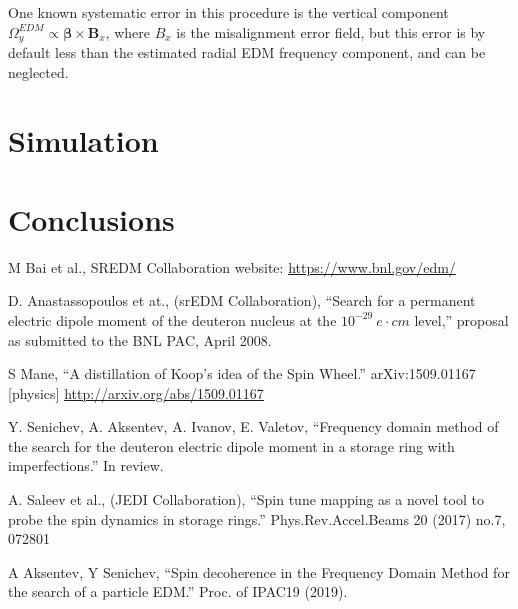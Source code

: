 \documentclass[a4paper]{jacow}
\renewcommand{\vec}{\boldsymbol}
\newcommand{\W}{\Omega}
\begin{document}
One known systematic error in this procedure is the vertical component $\W_y^{EDM} \propto \vec\beta\times\vec B_x$, where $B_x$ is the misalignment error field, but this error is by default less than the estimated radial EDM frequency component, and can be neglected.

\section{Simulation}

\section{Conclusions}


\begin{thebibliography}{9}

  M Bai et al., SREDM Collaboration website: \url{https://www.bnl.gov/edm/}

  D. Anastassopoulos et at., (srEDM Collaboration), ``Search for a permanent electric dipole moment of the deuteron nucleus at the $10^{-29}~e\cdot cm$ level,'' proposal as submitted to the BNL PAC, April 2008.

  S Mane, ``A distillation of Koop's idea of the Spin Wheel.'' arXiv:1509.01167 [physics] \url{http://arxiv.org/abs/1509.01167}
  
  Y. Senichev, A. Aksentev, A. Ivanov, E. Valetov, ``Frequency domain method of the search for the deuteron electric dipole moment in a storage ring with imperfections.'' In review.

  A. Saleev et al., (JEDI Collaboration), ``Spin tune mapping as a novel tool to probe the spin dynamics in storage rings.'' Phys.Rev.Accel.Beams 20 (2017) no.7, 072801

  A Aksentev, Y Senichev, ``Spin decoherence in the Frequency Domain Method for the search of a particle EDM.'' Proc. of IPAC19 (2019).
  



  
\end{thebibliography}
\end{document}
